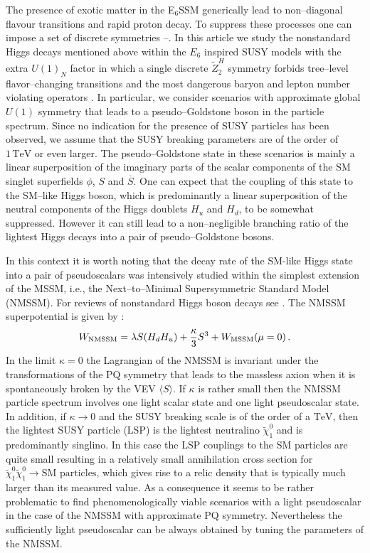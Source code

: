 \documentclass[12pt,a4paper]{article}
\begin{document}
The presence of exotic matter in the E$_6$SSM generically lead to non--diagonal flavour transitions and rapid proton
decay. To suppress these processes one can impose a set of discrete symmetries \cite{King:2005jy}--\cite{King:2005my}.
In this article we study the nonstandard Higgs decays mentioned above within the $E_6$ inspired SUSY models
with the extra $U(1)_{N}$ factor in which a single discrete $\tilde{Z}^{H}_2$ symmetry forbids tree--level
flavor--changing transitions and the most dangerous baryon and lepton number violating operators \cite{nevzorov}.
In particular, we consider scenarios with approximate global $U(1)$ symmetry that leads to a pseudo--Goldstone
boson in the particle spectrum. Since no indication for the presence of SUSY particles has been observed, we
assume that the SUSY breaking parameters are of the order of $1\,\mbox{TeV}$ or even larger. The pseudo--Goldstone
state in these scenarios is mainly a linear superposition of the imaginary parts of the scalar components of the
SM singlet superfields $\phi$, $S$ and $\overline{S}$. One can expect that the coupling of this state
to the SM--like Higgs boson, which is predominantly a linear superposition of the neutral components of the Higgs
doublets $H_u$ and $H_{d}$, to be somewhat suppressed. 
However it can still lead to a non--negligible branching ratio of the
lightest Higgs decays into a pair of pseudo--Goldstone bosons.

In this context it is worth noting that the decay rate of the SM-like Higgs state into a pair of pseudoscalars was
intensively studied within the simplest extension of the MSSM, i.e., the 
Next--to--Minimal Supersymmetric Standard Model
(NMSSM). For reviews of nonstandard Higgs boson decays see \cite{Chang:2008cw}.
The NMSSM superpotential
is given by \cite{review-nmssm}:
\begin{equation}
W_{\rm NMSSM}=\lambda S(H_d H_u)+\dfrac{\kappa}{3} S^3 + W_{\rm MSSM}(\mu=0)\,.
\label{hd5}
\end{equation}
In the limit $\kappa= 0$ the Lagrangian of the NMSSM is invariant under the transformations of the
PQ symmetry that leads to the massless axion when it is spontaneously broken by the VEV $\langle S\rangle$.
If $\kappa$ is rather small then the NMSSM particle spectrum involves one light scalar
state and one light pseudoscalar state.
In addition, if $\kappa\to 0$ and the SUSY breaking scale is of the order of a
$\mbox{TeV}$,
then the lightest SUSY particle (LSP) is the lightest neutralino $\tilde{\chi}^0_1$
and is predominantly singlino.
In this case the LSP couplings to the SM particles are quite small resulting in a relatively small annihilation cross
section for $\tilde{\chi}^0_1\tilde{\chi}^0_1\to \mbox{SM particles}$,
which gives rise to a relic density that is
typically much larger than its measured value. As a consequence it seems to be rather problematic to find
phenomenologically viable scenarios with a light pseudoscalar in the case of the
NMSSM with approximate PQ symmetry.
Nevertheless the sufficiently light pseudoscalar can be always obtained by tuning the parameters of the NMSSM.
\end{document}
